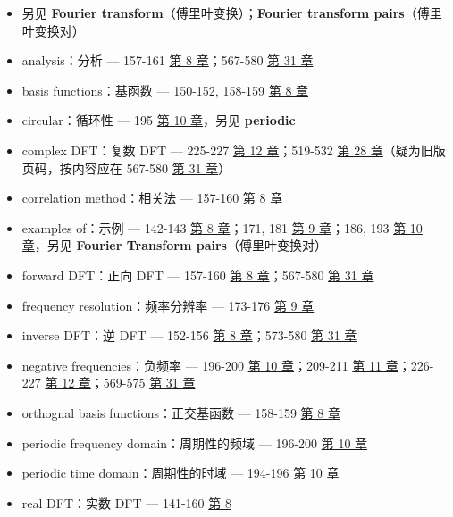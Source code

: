\begin{itemize}
  \begin{itemize}
  \tightlist
  \item
    另见 \textbf{Fourier transform}（傅里叶变换）；\textbf{Fourier
    transform pairs}（傅里叶变换对）
  \item
    analysis：分析 --- 157-161  \hyperref[ch-08]{第 8
    章}；567-580  \hyperref[ch-31]{第 31 章}
  \item
    basis functions：基函数 --- 150-152, 158-159 
    \hyperref[ch-08]{第 8 章}
  \item
    circular：循环性 --- 195  \hyperref[ch-10]{第 10 章}，另见
    \textbf{periodic}
  \item
    complex DFT：复数 DFT --- 225-227  \hyperref[ch-12]{第 12
    章}；519-532  \hyperref[ch-28]{第 28
    章}（疑为旧版页码，按内容应在 567-580  \hyperref[ch-31]{第
    31 章}）
  \item
    correlation method：相关法 --- 157-160 
    \hyperref[ch-08]{第 8 章}
  \item
    examples of：示例 --- 142-143  \hyperref[ch-08]{第 8
    章}；171, 181  \hyperref[ch-09]{第 9 章}；186, 193
     \hyperref[ch-10]{第 10 章}，另见 \textbf{Fourier
    Transform pairs}（傅里叶变换对）
  \item
    forward DFT：正向 DFT --- 157-160  \hyperref[ch-08]{第 8
    章}；567-580  \hyperref[ch-31]{第 31 章}
  \item
    frequency resolution：频率分辨率 --- 173-176 
    \hyperref[ch-09]{第 9 章}
  \item
    inverse DFT：逆 DFT --- 152-156  \hyperref[ch-08]{第 8
    章}；573-580  \hyperref[ch-31]{第 31 章}
  \item
    negative frequencies：负频率 --- 196-200 
    \hyperref[ch-10]{第 10 章}；209-211  \hyperref[ch-11]{第
    11 章}；226-227  \hyperref[ch-12]{第 12 章}；569-575
     \hyperref[ch-31]{第 31 章}
  \item
    orthognal basis functions：正交基函数 --- 158-159 
    \hyperref[ch-08]{第 8 章}
  \item
    periodic frequency domain：周期性的频域 --- 196-200 
    \hyperref[ch-10]{第 10 章}
  \item
    periodic time domain：周期性的时域 --- 194-196 
    \hyperref[ch-10]{第 10 章}
  \item
    real DFT：实数 DFT --- 141-160  \hyperref[ch-08]{第 8
}
\end{itemize}
\end{itemize}
